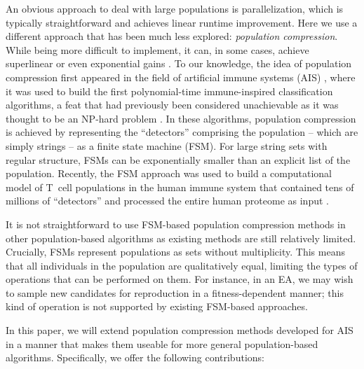 \documentclass{llncs}
\begin{document}
An obvious approach to deal with large populations is parallelization, which is typically straightforward and achieves linear runtime improvement. Here we use a different approach that has been much less explored: \emph{population compression}. While being more difficult to implement, it can, in some cases, achieve superlinear or even exponential gains \cite{Liskiewicz2010}. To our knowledge, the idea of population compression first appeared in the field of artificial immune systems (AIS) \cite{Elberfeld_2009}, where it was used to build the first polynomial-time immune-inspired classification algorithms, a feat that had previously been considered unachievable as it was thought to be an NP-hard problem \cite{Timmis2008}. In these algorithms, population compression is achieved by representing the ``detectors'' comprising the population -- which are simply strings -- as a finite state machine (FSM). For large string sets with regular structure, FSMs can be exponentially smaller than an explicit list of the population. Recently, the FSM approach was used to build a computational model of T~cell populations in the human immune system that contained tens of millions of ``detectors'' and processed the entire human proteome as input \cite{Wortel2020t}. 

It is not straightforward to use FSM-based population compression methods in other population-based algorithms as existing methods are still relatively limited. Crucially, FSMs represent populations as sets without multiplicity. This means that all individuals in the population are qualitatively equal, limiting the types of operations that can be performed on them. For instance, in an EA, we may wish to sample new candidates for reproduction in a fitness-dependent manner; this kind of operation is not supported by existing FSM-based approaches.

In this paper, we will extend population compression methods developed for AIS in a manner
that makes them useable for more general population-based algorithms. Specifically, we 
offer the following contributions: 
\end{document}

